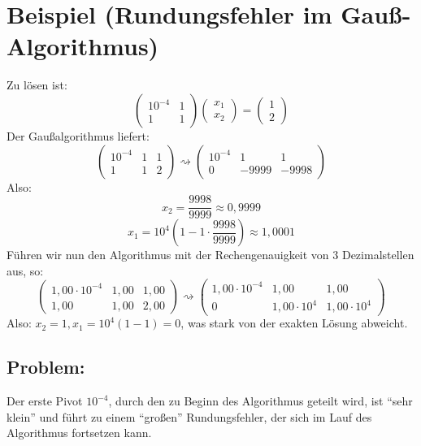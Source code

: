 \documentclass{scrbook}
\begin{document}
\section{Beispiel (Rundungsfehler im Gauß-Algorithmus)}
Zu lösen ist:
\[
\left(
\begin{array}{cc}
10^{-4}&1\\
1&1
\end{array}
\right)
\left(
\begin{array}{c}
x_1\\
x_2
\end{array}
\right)=
\left(
\begin{array}{c}
1\\
2
\end{array}
\right)
\]
Der Gaußalgorithmus liefert:
\[
\left(
\begin{array}{cc|l}
10^{-4}&1&1\\
1&1&2
\end{array}
\right)
\rightsquigarrow
\left(
\begin{array}{cc|l}
10^{-4}&1&1\\
0&-9999&-9998
\end{array}
\right)
\]
Also:
\[
x_2 = \dfrac{9998}{9999} \approx0,9999
\]
\[
x_1 = 10^4(1-1 \cdot \dfrac{9998}{9999})\approx 1,0001
\]
Führen wir nun den Algorithmus mit der Rechengenauigkeit von 3 Dezimalstellen aus, so:
\[
\left(
\begin{array}{cc|c}
1,00 \cdot 10^{-4}&1,00&1,00\\
1,00&1,00&2,00
\end{array}
\right)
\rightsquigarrow
\left(
\begin{array}{cc|c}
1,00 \cdot 10^{-4}&1,00&1,00\\
0&1,00 \cdot 10^{4}&1,00 \cdot 10^4
\end{array}
\right)
\]
Also: \(x_2=1,x_1=10^4(1-1)=0\), was stark von der exakten Lösung abweicht.
\subsection*{Problem:}
Der erste Pivot \(10^{-4}\), durch den zu Beginn des Algorithmus geteilt wird, ist "`sehr klein"' und führt zu einem "`großen"' Rundungsfehler, der sich im Lauf des Algorithmus fortsetzen kann.
\end{document}
